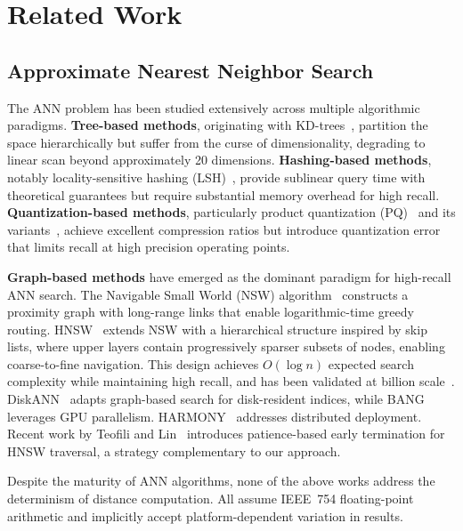 \documentclass[10pt,journal]{IEEEtran}
\newcommand{\hnsw}{\textsc{HNSW}}
\begin{document}
\section{Related Work}
\label{sec:related}

\subsection{Approximate Nearest Neighbor Search}

The ANN problem has been studied extensively across multiple algorithmic paradigms. \textbf{Tree-based methods}, originating with KD-trees~\cite{bentley1975kdtree}, partition the space hierarchically but suffer from the curse of dimensionality, degrading to linear scan beyond approximately 20 dimensions. \textbf{Hashing-based methods}, notably locality-sensitive hashing (LSH)~\cite{gionis1999lsh}, provide sublinear query time with theoretical guarantees but require substantial memory overhead for high recall. \textbf{Quantization-based methods}, particularly product quantization (PQ)~\cite{jegou2011pq} and its variants~\cite{baranchuk2018revisiting}, achieve excellent compression ratios but introduce quantization error that limits recall at high precision operating points.

\textbf{Graph-based methods} have emerged as the dominant paradigm for high-recall ANN search. The Navigable Small World (NSW) algorithm~\cite{malkov2014nsw} constructs a proximity graph with long-range links that enable logarithmic-time greedy routing. \hnsw{}~\cite{malkov2020hnsw} extends NSW with a hierarchical structure inspired by skip lists, where upper layers contain progressively sparser subsets of nodes, enabling coarse-to-fine navigation. This design achieves $O(\log n)$ expected search complexity while maintaining high recall, and has been validated at billion scale~\cite{simhadri2022neurips}. DiskANN~\cite{subramanya2019diskann} adapts graph-based search for disk-resident indices, while BANG~\cite{karthik2024bang} leverages GPU parallelism. HARMONY~\cite{xu2025harmony} addresses distributed deployment. Recent work by Teofili and Lin~\cite{teofili2025patience} introduces patience-based early termination for \hnsw{} traversal, a strategy complementary to our approach.

Despite the maturity of ANN algorithms, none of the above works address the determinism of distance computation. All assume IEEE~754 floating-point arithmetic and implicitly accept platform-dependent variation in results.
\end{document}

